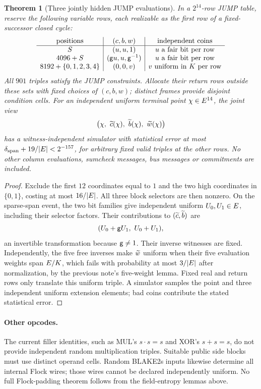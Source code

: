 \documentclass[11pt]{article}
\newtheorem{theorem}[lemma]{Theorem}
\begin{document}
\begin{theorem}[Three jointly hidden JUMP evaluations]\label{thm:jump-terminals}
In a $2^{14}$-row JUMP table, reserve the following variable rows, each realizable as the first row of a fixed-successor closed cycle:
\[
\begin{array}{c|c|c}
\text{positions} & (c,b,w) & \text{independent coins}\\\hline
S & (u,u,1) & u\text{ a fair bit per row}\\
4096+S & (\mathsf{g} u,u,\mathsf{g}^{-1}) & u\text{ a fair bit per row}\\
8192+\{0,1,2,3,4\} & (0,0,v) & v\text{ uniform in }K\text{ per row}
\end{array}
\]
All $901$ triples satisfy the JUMP constraints. Allocate their return rows outside these sets with fixed choices of $(c,b,w)$; distinct frames provide disjoint condition cells. For an independent uniform terminal point $\chi\in E^{14}$, the joint view
\[
 \bigl(\fc,\ \mle c(\fc),\ \mle b(\fc),\ \mle w(\fc)\bigr)
\]
has a witness-independent simulator with statistical error at most $\delta_{\mathrm{span}}+19/|E|<2^{-157}$, for arbitrary fixed valid triples at the other rows. No other column evaluations, sumcheck messages, bus messages or commitments are included.
\end{theorem}
\begin{proof}
Exclude the first $12$ coordinates equal to $1$ and the two high coordinates in $\{0,1\}$, costing at most $16/|E|$. All three block selectors are then nonzero. On the sparse-span event, the two bit families give independent uniform $U_0,U_1\in E$, including their selector factors. Their contributions to $(\widetilde{c},\widetilde{b})$ are
\[
 (U_0+\gen U_1,\ U_0+U_1),
\]
an invertible transformation because $\mathsf{g}\ne1$. Their inverse witnesses are fixed. Independently, the five free inverses make $\widetilde{w}$ uniform when their five evaluation weights span $E/K$, which fails with probability at most $3/|E|$ after normalization, by the previous note's five-weight lemma. Fixed real and return rows only translate this uniform triple. A simulator samples the point and three independent uniform extension elements; bad coins contribute the stated statistical error.
\end{proof}

\paragraph{Other opcodes.} The current filler identities, such as MUL's $s\cdot s=s$ and XOR's $s+s=s$, do not provide independent random multiplication triples. Suitable public side blocks must use distinct operand cells. Random BLAKE2s inputs likewise determine all internal Flock wires; those wires cannot be declared independently uniform. No full Flock-padding theorem follows from the field-entropy lemmas above.
\end{document}

